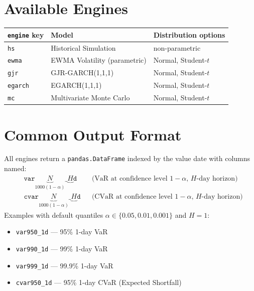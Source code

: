 \documentclass[11pt, a4paper]{article}
\begin{document}
\section{Available Engines}

\begin{tabular}{lll}
\toprule
\texttt{engine} key & Model & Distribution options \\
\midrule
\texttt{hs}    & Historical Simulation          & non-parametric \\
\texttt{ewma}  & EWMA Volatility (parametric)   & Normal, Student-$t$ \\
\texttt{gjr}   & GJR-GARCH(1,1,1)              & Normal, Student-$t$ \\
\texttt{egarch}& EGARCH(1,1,1)                  & Normal, Student-$t$ \\
\texttt{mc}    & Multivariate Monte Carlo        & Normal, Student-$t$ \\
\bottomrule
\end{tabular}

\section{Common Output Format}

All engines return a \texttt{pandas.DataFrame} indexed by the value date
with columns named:
\begin{align*}
&\texttt{var}\underbrace{N}_{1000(1-\alpha)}\texttt{\_}\underbrace{H}_{}\texttt{d}
&&\text{(VaR at confidence level $1-\alpha$, $H$-day horizon)} \\
&\texttt{cvar}\underbrace{N}_{1000(1-\alpha)}\texttt{\_}\underbrace{H}_{}\texttt{d}
&&\text{(CVaR at confidence level $1-\alpha$, $H$-day horizon)}
\end{align*}
Examples with default quantiles $\alpha \in \{0.05, 0.01, 0.001\}$ and $H=1$:
\begin{itemize}
  \item \texttt{var950\_1d} --- 95\% 1-day VaR
  \item \texttt{var990\_1d} --- 99\% 1-day VaR
  \item \texttt{var999\_1d} --- 99.9\% 1-day VaR
  \item \texttt{cvar950\_1d} --- 95\% 1-day CVaR (Expected Shortfall)
\end{itemize}

\end{document}
